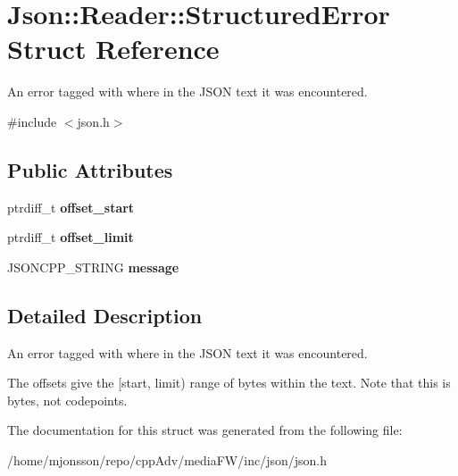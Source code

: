 \hypertarget{structJson_1_1Reader_1_1StructuredError}{}\section{Json\+:\+:Reader\+:\+:Structured\+Error Struct Reference}
\label{structJson_1_1Reader_1_1StructuredError}


An error tagged with where in the J\+S\+ON text it was encountered.  




{\ttfamily \#include $<$json.\+h$>$}

\subsection*{Public Attributes}
\begin{DoxyCompactItemize}
\item 
\mbox{\label{structJson_1_1Reader_1_1StructuredError_ac98af0da2d704be4b64a9572a682423b}} 
ptrdiff\+\_\+t {\bfseries offset\+\_\+start}
\item 
\mbox{\label{structJson_1_1Reader_1_1StructuredError_ad76ac01aeb0ada7e882c2df5daa54c6e}} 
ptrdiff\+\_\+t {\bfseries offset\+\_\+limit}
\item 
\mbox{\label{structJson_1_1Reader_1_1StructuredError_a2d2dc387aefe406a71de3daa263a38f4}} 
J\+S\+O\+N\+C\+P\+P\+\_\+\+S\+T\+R\+I\+NG {\bfseries message}
\end{DoxyCompactItemize}


\subsection{Detailed Description}
An error tagged with where in the J\+S\+ON text it was encountered. 

The offsets give the \mbox{[}start, limit) range of bytes within the text. Note that this is bytes, not codepoints. 

The documentation for this struct was generated from the following file\+:\begin{DoxyCompactItemize}
\item 
/home/mjonsson/repo/cpp\+Adv/media\+F\+W/inc/json/json.\+h\end{DoxyCompactItemize}
